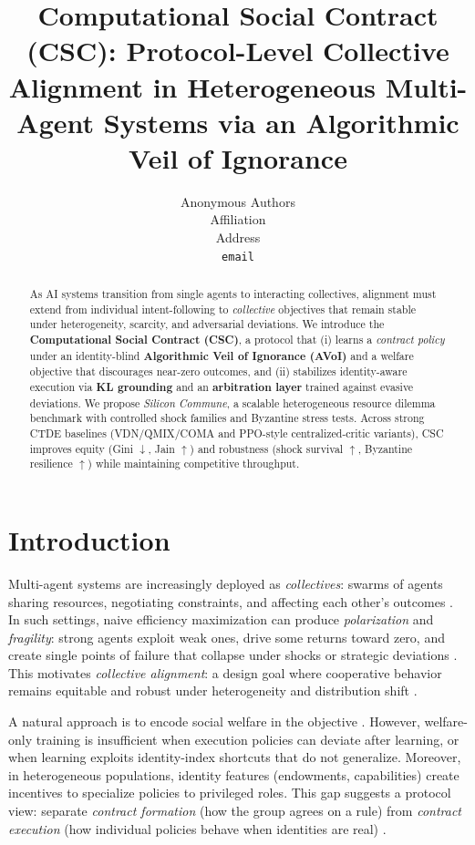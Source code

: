 \documentclass{article}
\title{Computational Social Contract (CSC): Protocol-Level Collective Alignment in Heterogeneous Multi-Agent Systems via an Algorithmic Veil of Ignorance}
\author{%
  Anonymous Authors \\
  Affiliation \\
  Address \\
  \texttt{email} \\
}
\date{}
\theoremstyle{definition}
\theoremstyle{plain}
\theoremstyle{remark}
\begin{document}
\maketitle

\begin{abstract}
As AI systems transition from single agents to interacting collectives, alignment must extend from individual intent-following to \emph{collective} objectives that remain stable under heterogeneity, scarcity, and adversarial deviations.
We introduce the \textbf{Computational Social Contract (CSC)}, a protocol that (i) learns a \emph{contract policy} under an identity-blind \textbf{Algorithmic Veil of Ignorance (AVoI)} and a welfare objective that discourages near-zero outcomes, and (ii) stabilizes identity-aware execution via \textbf{KL grounding} and an \textbf{arbitration layer} trained against evasive deviations.
We propose \textit{Silicon Commune}, a scalable heterogeneous resource dilemma benchmark with controlled shock families and Byzantine stress tests.
Across strong CTDE baselines (VDN/QMIX/COMA and PPO-style centralized-critic variants), CSC improves equity (Gini $\downarrow$, Jain $\uparrow$) and robustness (shock survival $\uparrow$, Byzantine resilience $\uparrow$) while maintaining competitive throughput.
\end{abstract}

\section{Introduction}
\label{sec:intro}

Multi-agent systems are increasingly deployed as \emph{collectives}: swarms of agents sharing resources, negotiating constraints, and affecting each other's outcomes \citep{dafoe2021cooperativeai_nature,rahwan2019machine}.
In such settings, naive efficiency maximization can produce \emph{polarization} and \emph{fragility}: strong agents exploit weak ones, drive some returns toward zero, and create single points of failure that collapse under shocks or strategic deviations \citep{leibo2017multiagent,hughes2018inequity,hardin1968tragedy,ostrom1990governing}.
This motivates \emph{collective alignment}: a design goal where cooperative behavior remains equitable and robust under heterogeneity and distribution shift \citep{christian2020alignment,russell2019humancompatible}.

A natural approach is to encode social welfare in the objective \citep{sen1973inequality,young1994equity}.
However, welfare-only training is insufficient when execution policies can deviate after learning, or when learning exploits identity-index shortcuts that do not generalize.
Moreover, in heterogeneous populations, identity features (endowments, capabilities) create incentives to specialize policies to privileged roles.
This gap suggests a protocol view: separate \emph{contract formation} (how the group agrees on a rule) from \emph{contract execution} (how individual policies behave when identities are real) \citep{sandholm1999distributed,shoham1995agent}.
\end{document}
